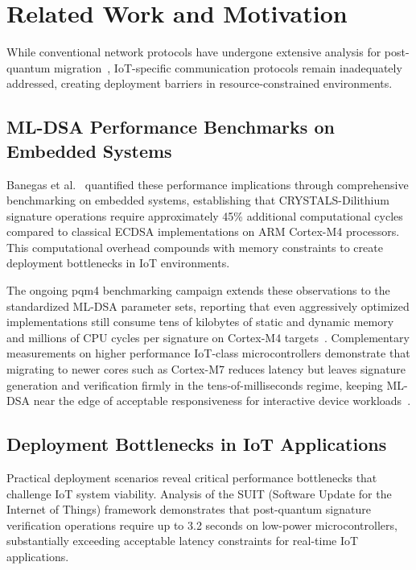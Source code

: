 \documentclass[journal=tches,final]{iacrtrans}
\begin{document}
\section{Related Work and Motivation}\label{sec:related}

While conventional network protocols have undergone extensive analysis for post-quantum migration~\cite{Kampanakis2020, Sikeridis2020}, IoT-specific communication protocols remain inadequately addressed, creating deployment barriers in resource-constrained environments.

\subsection{ML-DSA Performance Benchmarks on Embedded Systems}

Banegas et al.~\cite{Banegas2021} quantified these performance implications through comprehensive benchmarking on embedded systems, establishing that CRYSTALS-Dilithium signature operations require approximately 45\% additional computational cycles compared to classical ECDSA implementations on ARM Cortex-M4 processors. This computational overhead compounds with memory constraints to create deployment bottlenecks in IoT environments.

The ongoing pqm4 benchmarking campaign extends these observations to the standardized ML-DSA parameter sets, reporting that even aggressively optimized implementations still consume tens of kilobytes of static and dynamic memory and millions of CPU cycles per signature on Cortex-M4 targets~\cite{pqm4-benchmarks}. Complementary measurements on higher performance IoT-class microcontrollers demonstrate that migrating to newer cores such as Cortex-M7 reduces latency but leaves signature generation and verification firmly in the tens-of-milliseconds regime, keeping ML-DSA near the edge of acceptable responsiveness for interactive device workloads~\cite{Benchmark2022}.

\subsection{Deployment Bottlenecks in IoT Applications}

Practical deployment scenarios reveal critical performance bottlenecks that challenge IoT system viability. Analysis of the SUIT (Software Update for the Internet of Things) framework demonstrates that post-quantum signature verification operations require up to 3.2 seconds on low-power microcontrollers, substantially exceeding acceptable latency constraints for real-time IoT applications.
\end{document}

